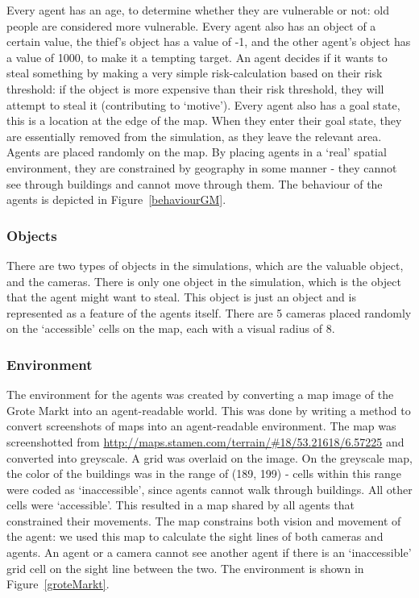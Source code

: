 \documentclass[11pt]{article}
\begin{document}
 Every agent has an age, to determine whether they are vulnerable or not: old people are considered more vulnerable. Every agent also has an object of a certain value, the thief's object has a value of -1, and the other agent's object has a value of 1000, to make it a tempting target. An agent decides if it wants to steal something by making a very simple risk-calculation based on their risk threshold: if the object is more expensive than their risk threshold, they will attempt to steal it (contributing to `motive'). Every agent also has a goal state, this is a location at the edge of the map. When they enter their goal state, they are essentially removed from the simulation, as they leave the relevant area. Agents are placed randomly on the map.  By placing agents in a `real' spatial environment, they are constrained by geography in some manner - they cannot see through buildings and cannot move through them. The behaviour of the agents is depicted in Figure~\ref{behaviourGM}.


\subsubsection{Objects} 

There are two types of objects in the simulations, which are the valuable object, and the cameras. 
There is only one object in the simulation, which is the object that the agent might want to steal. This object is just an object and is represented as a feature of the agents itself.
There are 5 cameras placed randomly on the `accessible' cells on the map, each with a visual radius of 8. 

\subsubsection{Environment}

 The environment for the agents was created by converting a map image of the Grote Markt into an agent-readable world. This was done by writing a method to convert screenshots of maps into an agent-readable environment. The map was screenshotted from \url{http://maps.stamen.com/terrain/#18/53.21618/6.57225} and converted into greyscale. A grid was overlaid on the image. On the greyscale map, the color of the buildings was in the range of (189, 199) - cells within this range were coded as `inaccessible', since agents cannot walk through buildings. All other cells were `accessible'. This resulted in a map shared by all agents that constrained their movements. The map constrains both vision and movement of the agent: we used this map to calculate the sight lines of both cameras and agents. An agent or a camera cannot see another agent if there is an `inaccessible' grid cell on the sight line between the two. The environment is shown in Figure~\ref{groteMarkt}.
\end{document}
